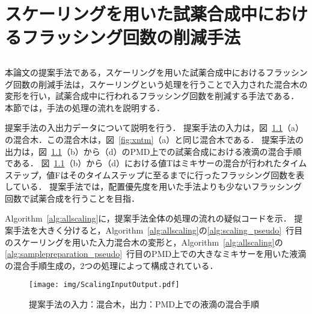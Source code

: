 \chapter{スケーリングを用いた試薬合成中におけるフラッシング回数の削減手法}
\section{}
本論文の提案手法である，スケーリングを用いた試薬合成中におけるフラッシング回数の削減手法は，スケーリングという処理を行うことで入力された混合木の変形を行い，試薬合成中に行われるフラッシング回数を削減する手法である．
本節では，手法の処理の流れを説明する．

提案手法の入出力データについて説明を行う．
提案手法の入力は，図~\ref{fig:ScalingInputOutput}（a）の混合木．この混合木は，図~\ref{fig:xntm}（a）と同じ混合木である．
提案手法の出力は，図~\ref{fig:ScalingInputOutput}（b）から（d）のPMD上での試薬合成における液滴の混合手順である．
図~\ref{fig:ScalingInputOutput}（b）から（d）における値Tはミキサーの混合が行われたタイムステップ，値Fはそのタイムステップに至るまでに行ったフラッシング回数を表している．
提案手法では，配置優先度を用いた手法よりも少ないフラッシング回数で試薬合成を行うことを目指．

Algorithm~\ref{alg:allscaling}に，提案手法全体の処理の流れの疑似コードを示．
提案手法を大きく分けると，Algorithm~\ref{alg:allscaling}の\ref{alg:scaling_pseudo}~行目のスケーリングを用いた入力混合木の変形と，Algorithm~\ref{alg:allscaling}の\ref{alg:samplepreparation_pseudo}~行目のPMD上での大きなミキサーを用いた液滴の混合手順生成の，2つの処理によって構成されている．

\begin{figure}[tbp]
 \centering 
    \begin{center}
    \texttt{[image: img/ScalingInputOutput.pdf]}
    \end{center}
 \caption{提案手法の入力：混合木，出力：PMD上での液滴の混合手順}\label{fig:ScalingInputOutput}
\end{figure}

